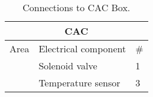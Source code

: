 \begin{table}[H]
\centering

\begin{tabular}{|l|l|l|}
\hline
\multicolumn{3}{|c|}{\textbf{CAC}}                                                                                      \\ \hline
\multicolumn{1}{|c|}{Area}                        & \multicolumn{1}{c|}{Electrical component} & \multicolumn{1}{c|}{\#} \\ \hline
\rowcolor[HTML]{FFCC67} 
\cellcolor[HTML]{FFCC67}                          & Solenoid valve                            & 1                       \\ \cline{2-3} 
\rowcolor[HTML]{FFCC67} 
\multirow{-2}{*}{\cellcolor[HTML]{FFCC67}CAC} & Temperature sensor                        & 3                       \\ \hline
\end{tabular}
\caption{Connections to CAC Box.}
\label{tab:list_of_components_CAC}
\end{table}